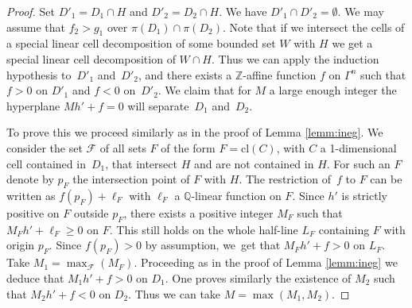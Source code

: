 \documentclass[10pt]{amsart}
\theoremstyle{definition}
\theoremstyle{remark}
\newcommand{\cl}{\mathrm{cl}}
\newcommand{\Q}{\mathbb Q}
\newcommand{\Z}{\mathbb Z}
\theoremstyle{plain}
\theoremstyle{definition}
\begin{document}
\begin{proof}
Set $D'_1= D_1\cap H$ and $D'_2 = D_2 \cap H$.
We have $D'_1 \cap D'_2 = \emptyset$.
We may assume that $f_2 > g_1$ over $\pi (D_1) \cap \pi (D_2)$.
Note that if we intersect the cells of a special linear cell decomposition of some bounded set $W$ with $H$ we get a special linear cell decomposition of $W \cap H$.
Thus we can apply the induction hypothesis to~$D'_1$ and~$D'_2$, and there exists a $\Z$-affine function $f$ on $\Gamma^n$
such that $f >0$ on $D'_1$ and $f <0$ on~$D'_2$.
We claim that for $M$ a large enough integer the hyperplane
$M h' +f = 0$ will separate~$D_1$ and~$D_2$.

To prove this we proceed similarly as in the proof of Lemma \ref{lemm:ineg}.
We consider the set $\mathcal{F}$ of all sets $F$ of the form $F = \cl (C)$, with $C$ a 1-dimensional cell contained in~$D_1$,
that intersect $H$ and are not contained in $H$.
For such an $F$ denote by
$p_F$ the intersection point of $F$ with $H$.
The restriction of~$f$ to
$F$ can be written as $f (p_F) + \ell_F$ with $\ell_F$ a $\Q$-linear function on $F$.
Since $h'$ is strictly positive on $F$ outside $p_F$,
there exists a positive integer $M_F$ such that $M_F h' + \ell_F \geq 0 $ on $F$.
This still holds on the whole half-line $L_F$ containing $F$ with origin $p_F$.
Since $f (p_F) > 0$ by assumption, we~get that $M_F h' + f > 0$ on $L_F$.
Take $M_1 = \max_{\mathcal{F}} (M_F)$.
Proceeding as in the proof of Lemma \ref{lemm:ineg} we deduce that
$M_1 h' + f >0$ on $D_1$.
One proves similarly the existence of $M_2$ such that
$M_2 h' + f <0$ on $D_2$. Thus we can take $M = \max (M_1, M_2)$.
\end{proof}
\end{document}
